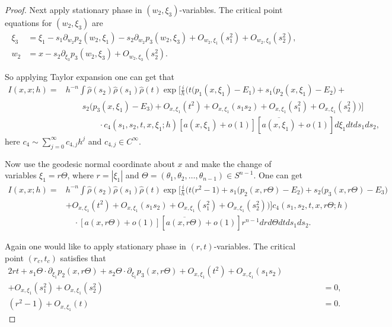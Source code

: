 \documentclass[12pt,reqno]{amsart}
\numberwithin{equation}{section}
\begin{document}
\begin{proof}
Next apply stationary phase in $(w_2, \xi_3)$-variables. The critical point equations for $(w_2,\xi_3)$ are
\begin{align}
\xi_3&=\xi_1-s_1\partial_{w_2} p_2(w_2,\xi_1)-s_2\partial_{w_2} p_3(w_2,\xi_3)+O_{w_2,\xi_1}(s_1^2)+ O_{w_2,\xi_3}(s_2^2),\\
w_2&=x-s_2\partial_{\xi_3} p_3(w_2,\xi_3)+ O_{w_2,\xi_3}(s_2^2).
\end{align}

So applying Taylor expansion one can get that
\begin{align}
I (x,x; h)=&h^{-n}\int \hat{\rho}(s_2)\hat{\rho}(s_1)\hat{\rho}(t)  \exp\Big[\frac{i}h\Big(t(p_1(x,\xi_1)-E_1\big)+ s_1\big(p_2(x,\xi_1)-E_2\big)+ \nonumber \\
&\qquad  s_2\big( p_3(x,\xi_1)-E_3 \big)+O_{x,\xi_1}(t^2)+O_{x,\xi_1}(s_1 s_2)+ O_{x,\xi_1}(s_1^2)+O_{x,\xi_1}(s_2^2) \Big)\Big] \nonumber\\
&\qquad\qquad \cdot c_4(s_1,s_2,t,x,\xi_1;h) [a(x, \xi_1)+o(1)] [\overline{a(x, \xi_1)}+o(1)] d\xi_1 dt ds_1 ds_2,
\end{align}
here $c_4\sim \sum_{j=0}^\infty c_{4,j} h^j$ and $c_{4,j}\in C^\infty$.

Now use the geodesic normal coordinate about $x$ and make the change of variables $\xi_1=r\Theta$, where $r=|\xi_1|$ and $\Theta=(\theta_1,\theta_2,\dots,\theta_{n-1})\in S^{n-1}$. One can get
\begin{align}\label{tilde I'}
I (x, x; h)=& h^{-n}\int \hat{\rho}(s_2)\hat{\rho}(s_1)\hat{\rho}(t)  \exp\Big[\frac{i}h\Big( t (r^2-1\big)+s_1\big(p_2(x, r\Theta)-E_2\big)+s_2\big( p_3(x,r\Theta)-E_3 \big) \nonumber\\ 
&+O_{x,\xi_1}(t^2)+O_{x,\xi_1}(s_1 s_2)+ O_{x,\xi_1}(s_1^2)+O_{x,\xi_1}(s_2^2) \Big)\Big]c_4(s_1,s_2,t, x,r\Theta;h)\nonumber \\
&\quad\cdot[a(x, r\Theta)+o(1)] [\overline{a(x, r\Theta)}+o(1)] r^{n-1} dr d\Theta dt ds_1 ds_2.
\end{align}

Again one would like to apply stationary phase in $(r, t)$-variables. The critical point $(r_c,t_c)$ satisfies that
\begin{align}
2r t  +s_1\Theta\cdot \partial_{\xi_1} p_2(x, r\Theta)+s_2\Theta\cdot \partial_{\xi_1} p_3(x, r\Theta)+O_{x,\xi_1}(t^2)+O_{x,\xi_1}(s_1 s_2)\qquad\qquad & \nonumber \\
+ O_{x,\xi_1}(s_1^2)+O_{x,\xi_1}(s_2^2)&=0, \label{2r}\\
(r^2-1)+O_{x,\xi_1}(t)&=0. \label{2E_1}
\end{align}


\end{proof}
\end{document}
